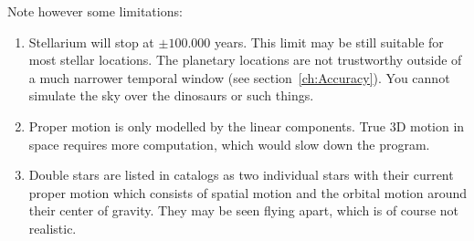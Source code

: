 Note however some limitations:
\begin{enumerate}
\item Stellarium will stop at $\pm 100.000$ years. This limit may be
  still suitable for most stellar locations. The planetary locations
  are not trustworthy outside of a much narrower temporal window (see
  section~\ref{ch:Accuracy}). You cannot simulate the sky over the
  dinosaurs or such things.
\item Proper motion is only modelled by the linear components. True 3D
  motion in space requires more computation, which would slow down the
  program.
\item Double stars are listed in catalogs as two individual stars with
  their current proper motion which consists of spatial motion and the 
  orbital motion around their center of gravity. They may be seen flying 
  apart, which is of course not realistic.
\end{enumerate}

